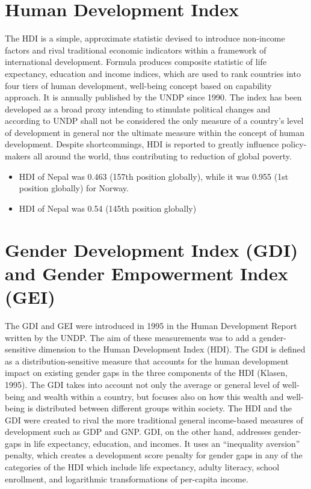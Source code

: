 \documentclass[
  openany]{book}
\providecommand{\tightlist}{%
  \setlength{\itemsep}{0pt}\setlength{\parskip}{0pt}}
\begin{document}
\hypertarget{human-development-index}{%
\section{Human Development Index}\label{human-development-index}}

The HDI is a simple, approximate statistic devised to introduce non-income factors and rival traditional economic indicators within a framework of international development. Formula produces composite statistic of life expectancy, education and income indices, which are used to rank countries into four tiers of human development, well-being concept based on capability approach. It is annually published by the UNDP since 1990. The index has been developed as a broad proxy intending to stimulate political changes and according to UNDP shall not be considered the only measure of a country's level of development in general nor the ultimate measure within the concept of human development. Despite shortcommings, HDI is reported to greatly influence policy-makers all around the world, thus contributing to reduction of global poverty.

\begin{itemize}
\tightlist
\item
  HDI of Nepal was 0.463 (157th position globally), while it was 0.955 (1st position globally) for Norway.
\item
  HDI of Nepal was 0.54 (145th position globally)
\end{itemize}

\hypertarget{gender-development-index-gdi-and-gender-empowerment-index-gei}{%
\section{Gender Development Index (GDI) and Gender Empowerment Index (GEI)}\label{gender-development-index-gdi-and-gender-empowerment-index-gei}}

The GDI and GEI were introduced in 1995 in the Human Development Report written by the UNDP. The aim of these measurements was to add a gender-sensitive dimension to the Human Development Index (HDI). The GDI is defined as a distribution-sensitive measure that accounts for the human development impact on existing gender gaps in the three components of the HDI (Klasen, 1995). The GDI takes into account not only the average or general level of well-being and wealth within a country, but focuses also on how this wealth and well-being is distributed between different groups within society. The HDI and the GDI were created to rival the more traditional general income-based measures of development such as GDP and GNP. GDI, on the other hand, addresses gender-gaps in life expectancy, education, and incomes. It uses an ``inequality aversion'' penalty, which creates a development score penalty for gender gaps in any of the categories of the HDI which include life expectancy, adulty literacy, school enrollment, and logarithmic transformations of per-capita income.
\end{document}
